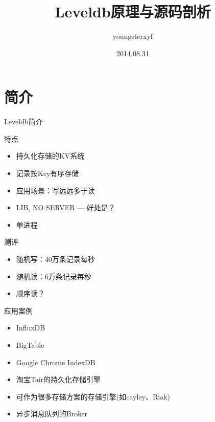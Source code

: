 \documentclass[CJK]{beamer}
\begin{document}
\begin{CJK*}{UTF8}{gkai}

\title{Leveldb原理与源码剖析}
\author{youngsterxyf}
\date{2014.08.31}

\begin{frame}[plain]
	\titlepage
\end{frame}

\section{简介}
\begin{frame}{Leveldb简介}
\begin{block}{特点}
	\begin{itemize}
	\item 持久化存储的KV系统
	\item 记录按Key有序存储
	\item 应用场景：写远远多于读
	\item LIB, NO SERVER --- 好处是？
	\item 单进程
	\end{itemize}
\end{block}

\begin{block}{测评}
	\begin{itemize}	
	\item 随机写：40万条记录每秒
	\item 随机读：6万条记录每秒
	\item 顺序读？
	\end{itemize}
\end{block}
\end{frame}

\begin{frame}{应用案例}
\begin{block}{}
	\begin{itemize}
	\item InfluxDB
	\item BigTable
	\item Google Chrome IndexDB
	\item 淘宝Tair的持久化存储引擎
	\item 可作为很多存储方案的存储引擎(如cayley、Riak)
	\item 异步消息队列的Broker
	\end{itemize}
\end{block}
\end{frame}


\end{CJK*}
\end{document}
